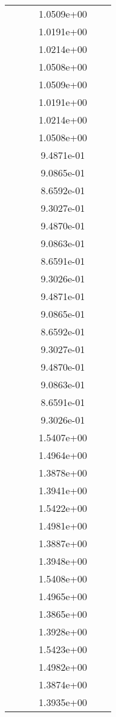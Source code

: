\begin{xltabular}{\textwidth}{r|rS[table-format=1.3e+2]S[table-format=1.4e+2]S[table-format=1.4e+2]S[table-format=-1.5]}
&  &  & 1.0509e+00 & & \\
&  &  & 1.0191e+00 & & \\
&  &  & 1.0214e+00 & & \\
&  &  & 1.0508e+00 & & \\
&  &  & 1.0509e+00 & & \\
&  &  & 1.0191e+00 & & \\
&  &  & 1.0214e+00 & & \\
&  &  & 1.0508e+00 & & \\
&  &  & 9.4871e-01 & & \\
&  &  & 9.0865e-01 & & \\
&  &  & 8.6592e-01 & & \\
&  &  & 9.3027e-01 & & \\
&  &  & 9.4870e-01 & & \\
&  &  & 9.0863e-01 & & \\
&  &  & 8.6591e-01 & & \\
&  &  & 9.3026e-01 & & \\
&  &  & 9.4871e-01 & & \\
&  &  & 9.0865e-01 & & \\
&  &  & 8.6592e-01 & & \\
&  &  & 9.3027e-01 & & \\
&  &  & 9.4870e-01 & & \\
&  &  & 9.0863e-01 & & \\
&  &  & 8.6591e-01 & & \\
&  &  & 9.3026e-01 & & \\
&  &  & 1.5407e+00 & & \\
&  &  & 1.4964e+00 & & \\
&  &  & 1.3878e+00 & & \\
&  &  & 1.3941e+00 & & \\
&  &  & 1.5422e+00 & & \\
&  &  & 1.4981e+00 & & \\
&  &  & 1.3887e+00 & & \\
&  &  & 1.3948e+00 & & \\
&  &  & 1.5408e+00 & & \\
&  &  & 1.4965e+00 & & \\
&  &  & 1.3865e+00 & & \\
&  &  & 1.3928e+00 & & \\
&  &  & 1.5423e+00 & & \\
&  &  & 1.4982e+00 & & \\
&  &  & 1.3874e+00 & & \\
&  &  & 1.3935e+00 & & \\

\end{xltabular}
